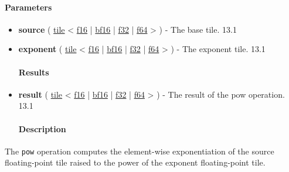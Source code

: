 \documentclass{article}
\begin{document}
\paragraph{Parameters}

\begin{itemize}
\item \textbf{source} ( \href{https://docs.nvidia.com/cuda/tile-ir/latest/sections/types.html#type-tile}{tile} < \href{https://docs.nvidia.com/cuda/tile-ir/latest/sections/types.html#subsection-element-types}{f16} | \href{https://docs.nvidia.com/cuda/tile-ir/latest/sections/types.html#subsection-element-types}{bf16} | \href{https://docs.nvidia.com/cuda/tile-ir/latest/sections/types.html#subsection-element-types}{f32} | \href{https://docs.nvidia.com/cuda/tile-ir/latest/sections/types.html#subsection-element-types}{f64} > ) - The base tile. 13.1
\item \textbf{exponent} ( \href{https://docs.nvidia.com/cuda/tile-ir/latest/sections/types.html#type-tile}{tile} < \href{https://docs.nvidia.com/cuda/tile-ir/latest/sections/types.html#subsection-element-types}{f16} | \href{https://docs.nvidia.com/cuda/tile-ir/latest/sections/types.html#subsection-element-types}{bf16} | \href{https://docs.nvidia.com/cuda/tile-ir/latest/sections/types.html#subsection-element-types}{f32} | \href{https://docs.nvidia.com/cuda/tile-ir/latest/sections/types.html#subsection-element-types}{f64} > ) - The exponent tile. 13.1


\paragraph{Results}

\item \textbf{result} ( \href{https://docs.nvidia.com/cuda/tile-ir/latest/sections/types.html#type-tile}{tile} < \href{https://docs.nvidia.com/cuda/tile-ir/latest/sections/types.html#subsection-element-types}{f16} | \href{https://docs.nvidia.com/cuda/tile-ir/latest/sections/types.html#subsection-element-types}{bf16} | \href{https://docs.nvidia.com/cuda/tile-ir/latest/sections/types.html#subsection-element-types}{f32} | \href{https://docs.nvidia.com/cuda/tile-ir/latest/sections/types.html#subsection-element-types}{f64} > ) - The result of the pow operation. 13.1


\paragraph{Description}

\end{itemize}
The \texttt{pow} operation computes the element-wise exponentiation of the source floating-point tile raised to the power of the exponent floating-point tile.
\end{document}
